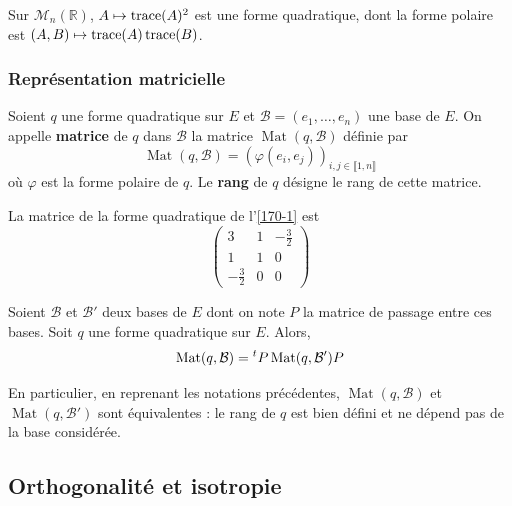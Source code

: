 
  \begin{example}
    Sur $\mathcal{M}_n(\mathbb{R})$, $A \mapsto \operatorname{trace}(A)^2$ est une forme quadratique, dont la forme polaire est $(A, B) \mapsto \operatorname{trace}(A)\operatorname{trace}(B)$.
  \end{example}

  \subsubsection{Représentation matricielle}


  \begin{definition}
    Soient $q$ une forme quadratique sur $E$ et $\mathcal{B} = (e_1, \dots, e_n)$ une base de $E$. On appelle \textbf{matrice} de $q$ dans $\mathcal{B}$ la matrice $\operatorname{Mat}(q, \mathcal{B})$ définie par
    \[ \operatorname{Mat}(q, \mathcal{B}) = (\varphi(e_i, e_j))_{i, j \in \llbracket 1, n \rrbracket} \]
    où $\varphi$ est la forme polaire de $q$. Le \textbf{rang} de $q$ désigne le rang de cette matrice.
  \end{definition}

  \begin{example}
    La matrice de la forme quadratique de l'\cref{170-1} est
    \[
      \begin{pmatrix}
        3 & 1 & -\frac{3}{2} \\
        1 & 1 & 0 \\
        -\frac{3}{2} & 0 & 0
      \end{pmatrix}
    \]
  \end{example}

  \begin{proposition}
    Soient $\mathcal{B}$ et $\mathcal{B}'$ deux bases de $E$ dont on note $P$ la matrice de passage entre ces bases. Soit $q$ une forme quadratique sur $E$. Alors,
    \[ \operatorname{Mat}(q, \mathcal{B}) = \mathstrut ^t P \operatorname{Mat}(q, \mathcal{B}') P \]
  \end{proposition}

  \begin{remark}
    En particulier, en reprenant les notations précédentes, $\operatorname{Mat}(q, \mathcal{B})$ et $\operatorname{Mat}(q, \mathcal{B}')$ sont équivalentes : le rang de $q$ est bien défini et ne dépend pas de la base considérée.
  \end{remark}

  \subsection{Orthogonalité et isotropie}

